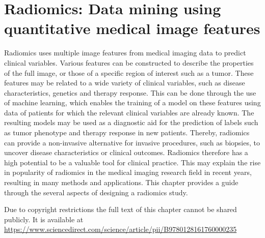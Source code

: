\chapter[Radiomics: Data mining using quantitative medical image features][Radiomics]{Radiomics: Data mining using quantitative medical image features}

\begin{ChapterAbstract}
Radiomics uses multiple image features from medical imaging data to predict clinical variables.
Various features can be constructed to describe the properties of the full image, or those of a specific region of interest such as a tumor.
These features may be related to a wide variety of clinical variables, such as disease characteristics, genetics and therapy response.
This can be done through the use of machine learning, which enables the training of a model on these features using data of patients for which the relevant clinical variables are already known.
The resulting models may be used as a diagnostic aid for the prediction of labels such as tumor phenotype and therapy response in new patients.
Thereby, radiomics can provide a non-invasive alternative for invasive procedures, such as biopsies, to uncover disease characteristics or clinical outcomes.
Radiomics therefore has a high potential to be a valuable tool for clinical practice.
This may explain the rise in popularity of radiomics in the medical imaging research field in recent years, resulting in many methods and applications.
This chapter provides a guide through the several aspects of designing a radiomics study.

\end{ChapterAbstract}

Due to copyright restrictions the full text of this chapter cannot be shared publicly. It is available at \url{https://www.sciencedirect.com/science/article/pii/B9780128161760000235}
